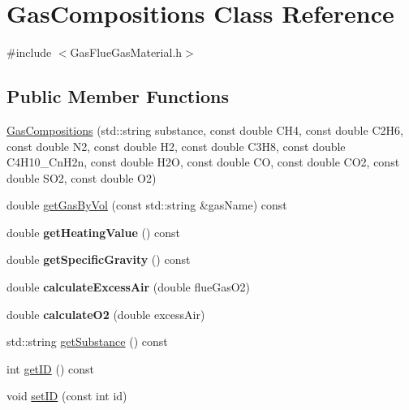 \hypertarget{class_gas_compositions}{}\section{Gas\+Compositions Class Reference}
\label{class_gas_compositions}


{\ttfamily \#include $<$Gas\+Flue\+Gas\+Material.\+h$>$}

\subsection*{Public Member Functions}
\begin{DoxyCompactItemize}
\item 
\hyperlink{class_gas_compositions_ad0021d4285883374f8904f9465e41920}{Gas\+Compositions} (std\+::string substance, const double C\+H4, const double C2\+H6, const double N2, const double H2, const double C3\+H8, const double C4\+H10\+\_\+\+Cn\+H2n, const double H2O, const double CO, const double C\+O2, const double S\+O2, const double O2)
\item 
double \hyperlink{class_gas_compositions_a2028a42c136e057a6153b7bfa68d63e6}{get\+Gas\+By\+Vol} (const std\+::string \&gas\+Name) const
\item 
\mbox{\label{class_gas_compositions_a7ebcdf1c991bd70f28eb845e45d62afd}} 
double {\bfseries get\+Heating\+Value} () const
\item 
\mbox{\label{class_gas_compositions_a4f891acb4f8dc3992703155c6ba7ccb0}} 
double {\bfseries get\+Specific\+Gravity} () const
\item 
\mbox{\label{class_gas_compositions_a4f6408254477960648440da460099e2d}} 
double {\bfseries calculate\+Excess\+Air} (double flue\+Gas\+O2)
\item 
\mbox{\label{class_gas_compositions_afc573b87fb7e7b99803b22470c402592}} 
double {\bfseries calculate\+O2} (double excess\+Air)
\item 
std\+::string \hyperlink{class_gas_compositions_abad9554bca9b68cd970eae11bdd3c505}{get\+Substance} () const
\item 
int \hyperlink{class_gas_compositions_a9668decdb2b5065c8ee3c59c207b9d51}{get\+ID} () const
\item 
void \hyperlink{class_gas_compositions_a9fc3ebfcbda7134b67ed76a39b4c94cc}{set\+ID} (const int id)
\end{DoxyCompactItemize}
